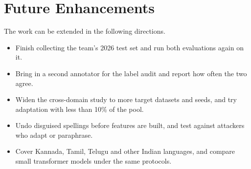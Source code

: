 \section{Future Enhancements}
The work can be extended in the following directions.
\begin{itemize}
\item Finish collecting the team's 2026 test set and run both evaluations again on it.
\item Bring in a second annotator for the label audit and report how often the two agree.
\item Widen the cross-domain study to more target datasets and seeds, and try adaptation with less than 10\% of the pool.
\item Undo disguised spellings before features are built, and test against attackers who adapt or paraphrase.
\item Cover Kannada, Tamil, Telugu and other Indian languages, and compare small transformer models under the same protocols.
\end{itemize}
